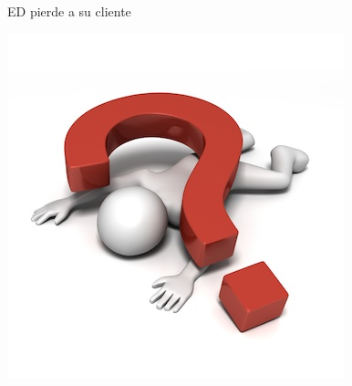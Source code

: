 \begin{frame}{ED pierde a su cliente}
  \begin{center}
    \includegraphics[scale=0.5]{img/ed_crushed}
  \end{center}
\end{frame}
